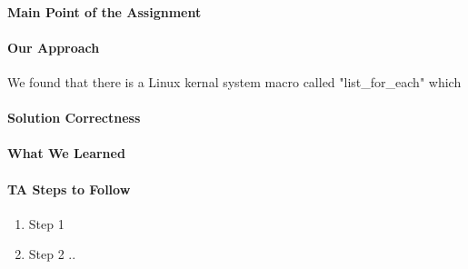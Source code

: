 \documentclass[titlepage,draftclsnofoot,onecolumn]{article}
\begin{document}
\paragraph{Main Point of the Assignment}

\paragraph{Our Approach}
We found that there is a Linux kernal system macro called "list_for_each" which

\paragraph{Solution Correctness}

\paragraph{What We Learned}

\paragraph{TA Steps to Follow}

\begin{enumerate}
  \item Step 1
  \item Step 2 ..
\end{enumerate}
\end{document}
